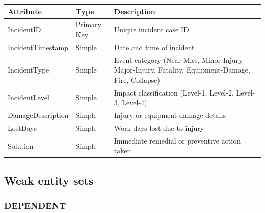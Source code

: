 \documentclass[a4paper,12pt]{report}
\newcounter{none} %
\begin{document}
{\def\LTcaptype{none} %
\begin{longtable}[]{@{}
  >{\raggedright\arraybackslash}p{}
  >{\raggedright\arraybackslash}p{}
  >{\raggedright\arraybackslash}p{}@{}}
\toprule\noalign{}
\begin{minipage}[b]{\linewidth}\raggedright
Attribute
\end{minipage} & \begin{minipage}[b]{\linewidth}\raggedright
Type
\end{minipage} & \begin{minipage}[b]{\linewidth}\raggedright
Description
\end{minipage} \\
\midrule\noalign{}
\endhead
\bottomrule\noalign{}
\endlastfoot
IncidentID & Primary Key & Unique incident case ID \\
IncidentTimestamp & Simple & Date and time of incident \\
IncidentType & Simple & Event category (\allowbreak{}Near-Miss, Minor-Injury, Major-Injury, Fatality, Equipment-Damage, Fire, Collapse) \\
IncidentLevel & Simple & Impact classification (\allowbreak{}Level-1, Level-2, Level-3, Level-4) \\
DamageDescription & Simple & Injury or equipment damage details \\
LostDays & Simple & Work days lost due to injury \\
Solution & Simple & Immediate remedial or preventive action taken \\
\end{longtable}
}

\subsection{Weak entity sets}\label{weak-entity-sets-1}

\subsubsection{DEPENDENT}\label{dependent}
\end{document}
